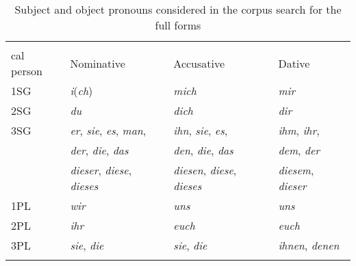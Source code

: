 \begin{table}
\caption{Subject and object pronouns considered in the corpus search for the full forms}
\centering
\begin{tabular}{llll}
\lsptoprule
\Centerstack[l]{Grammati- \\ cal person} & Nominative & Accusative & Dative \\
\midrule
1SG & \textit{i}(\textit{ch}) & \textit{mich} & \textit{mir} \\
2SG & \textit{du} & \textit{dich} & \textit{dir} \\
3SG & \textit{er}, \textit{sie}, \textit{es}, \textit{man}, & \textit{ihn}, \textit{sie}, \textit{es}, & \textit{ihm}, \textit{ihr}, \\
& \textit{der}, \textit{die}, \textit{das} & \textit{den}, \textit{die}, \textit{das} & \textit{dem}, \textit{der} \\
& \textit{dieser}, \textit{diese}, \textit{dieses} & \textit{diesen}, \textit{diese}, \textit{dieses} & \textit{diesem}, \textit{dieser} \\
1PL & \textit{wir} & \textit{uns} & \textit{uns} \\
2PL & \textit{ihr} & \textit{euch} & \textit{euch} \\
3PL & \textit{sie}, \textit{die} & \textit{sie}, \textit{die} & \textit{ihnen}, \textit{denen} \\
\lspbottomrule
\end{tabular}
\label{tab:weakly.pronouns}
\end{table}

